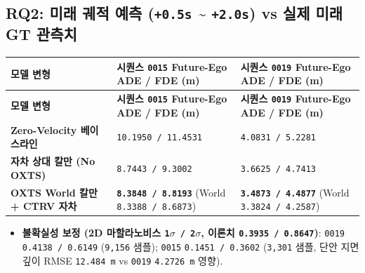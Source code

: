 \documentclass[10.5pt,a4paper]{article}
\begin{document}
\subsection{RQ2: 미래 궤적 예측 (\texttt{+0.\allowbreak{}5s} \textasciitilde{} \texttt{+2.\allowbreak{}0s}) vs 실제 미래 GT 관측치}

\begin{footnotesize}
\setlength{\tabcolsep}{4pt}
\setlength{\LTleft}{0pt}\setlength{\LTright}{0pt}
\begin{longtable}{>{\raggedright\arraybackslash}p{} >{\raggedright\arraybackslash}p{} >{\raggedright\arraybackslash}p{}}
\toprule
\textbf{모델 변형} & \textbf{시퀀스 \texttt{0015} Future-Ego ADE / FDE (m)} & \textbf{시퀀스 \texttt{0019} Future-Ego ADE / FDE (m)} \\
\midrule
\endfirsthead
\toprule
\textbf{모델 변형} & \textbf{시퀀스 \texttt{0015} Future-Ego ADE / FDE (m)} & \textbf{시퀀스 \texttt{0019} Future-Ego ADE / FDE (m)} \\
\midrule
\endhead
\bottomrule
\endfoot
\textbf{Zero-Velocity 베이스라인} & \texttt{10.\allowbreak{}1950 /\allowbreak{} 11.\allowbreak{}4531} & \texttt{4.\allowbreak{}0831 /\allowbreak{} 5.\allowbreak{}2281} \\
\textbf{자차 상대 칼만 (No OXTS)} & \texttt{8.\allowbreak{}7443 /\allowbreak{} 9.\allowbreak{}3002} & \texttt{3.\allowbreak{}6625 /\allowbreak{} 4.\allowbreak{}7413} \\
\textbf{OXTS World 칼만 + CTRV 자차} & \textbf{\texttt{8.\allowbreak{}3848 /\allowbreak{} 8.\allowbreak{}8193}} (World \texttt{8.\allowbreak{}3388 /\allowbreak{} 8.\allowbreak{}6873}) & \textbf{\texttt{3.\allowbreak{}4873 /\allowbreak{} 4.\allowbreak{}4877}} (World \texttt{3.\allowbreak{}3824 /\allowbreak{} 4.\allowbreak{}2587}) \\
\end{longtable}
\end{footnotesize}


\begin{itemize}[leftmargin=1.5em,itemsep=2pt]
\item \textbf{불확실성 보정 (2D 마할라노비스 \texttt{1$\sigma$ /\allowbreak{} 2$\sigma$}, 이론치 \texttt{0.\allowbreak{}3935 /\allowbreak{} 0.\allowbreak{}8647})}: \texttt{0019} \texttt{0.\allowbreak{}4138 /\allowbreak{} 0.\allowbreak{}6149} (\texttt{9,\allowbreak{}156} 샘플); \texttt{0015} \texttt{0.\allowbreak{}1451 /\allowbreak{} 0.\allowbreak{}3602} (\texttt{3,\allowbreak{}301} 샘플, 단안 지면 깊이 RMSE \texttt{12.\allowbreak{}484 m} vs \texttt{0019} \texttt{4.\allowbreak{}2726 m} 영향).
\end{itemize}
\end{document}
